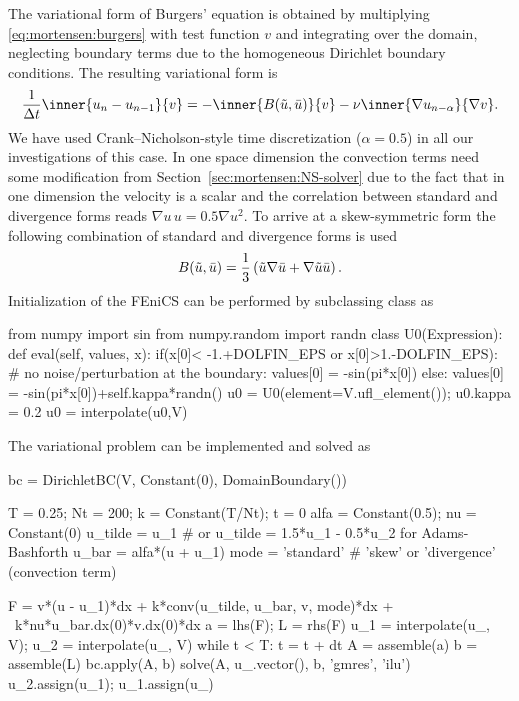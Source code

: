 The variational form of Burgers' equation is obtained by multiplying
\eqref{eq:mortensen:burgers} with test function $v$ and integrating over
the domain, neglecting boundary terms due to the homogeneous Dirichlet boundary
conditions. The resulting variational form is
\begin{equation}
 \frac{1}{\Delta t}\inner{ u_{n} - u_{n-1}}{v}
      = - \inner{B(\tilde{u},\Bar{u})}{ v }
          - \nu \inner{ \nabla u_{n-\alpha}}{\nabla v }.
\label{eq:mortensen:burgers_vf}
\end{equation}
We have used Crank--Nicholson-style time discretization ($\alpha=0.5$)
in all our investigations of this case. In one space
dimension the convection terms need some modification from
Section~\ref{sec:mortensen:NS-solver} due to the fact that in one dimension the
velocity is a scalar and the correlation between standard and divergence
forms reads $\nabla u \, u =0.5 \nabla u^2$. To arrive at a skew-symmetric
form the following combination of standard and divergence forms is used
\begin{equation}
 B(\tilde{u},\Bar{u})
    = \frac{1}{3}\left( \tilde{u}\nabla \Bar{u}
      + \nabla \tilde{u} \Bar{u} \right).
\end{equation}
Initialization of the FEniCS  can be performed by
subclassing class  as
\begin{python}
from numpy import sin
from numpy.random import randn
class U0(Expression):
    def eval(self, values, x):
        if(x[0]< -1.+DOLFIN_EPS or x[0]>1.-DOLFIN_EPS):
            # no noise/perturbation at the boundary:
            values[0] = -sin(pi*x[0])
        else:
            values[0] = -sin(pi*x[0])+self.kappa*randn()
u0 = U0(element=V.ufl_element()); u0.kappa = 0.2
u0 = interpolate(u0,V)
\end{python}
The variational problem can be implemented and solved as
\begin{python}
bc = DirichletBC(V, Constant(0), DomainBoundary())

T = 0.25; Nt = 200; k = Constant(T/Nt); t = 0
alfa = Constant(0.5); nu = Constant(0)
u_tilde = u_1 # or u_tilde = 1.5*u_1 - 0.5*u_2 for Adams-Bashforth
u_bar = alfa*(u + u_1)
mode = 'standard'  # 'skew' or 'divergence' (convection term)

F = v*(u - u_1)*dx + k*conv(u_tilde, u_bar, v, mode)*dx + \
    k*nu*u_bar.dx(0)*v.dx(0)*dx
a = lhs(F); L = rhs(F)
u_1 = interpolate(u_, V); u_2 = interpolate(u_, V)
while t < T:
    t = t + dt
    A = assemble(a)
    b = assemble(L)
    bc.apply(A, b)
    solve(A, u_.vector(), b, 'gmres', 'ilu')
    u_2.assign(u_1); u_1.assign(u_)
\end{python}

